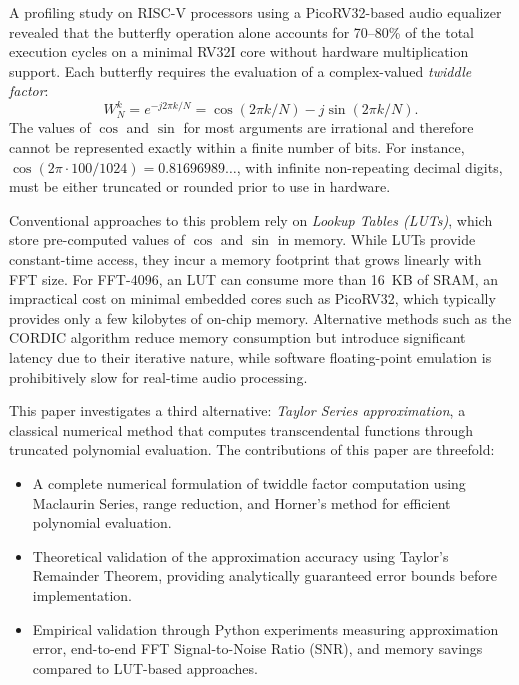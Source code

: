 \documentclass[conference]{IEEEtran}
\begin{document}
A profiling study on RISC-V processors using a PicoRV32-based audio
equalizer~\cite{qohar2026picorv32} revealed that the butterfly operation alone
accounts for 70--80\% of the total execution cycles on a minimal RV32I core
without hardware multiplication support. Each butterfly requires the evaluation
of a complex-valued
\textit{twiddle factor}:
\begin{equation}
W_N^k = e^{-j 2\pi k/N} = \cos(2\pi k/N) - j \sin(2\pi k/N).
\label{eq:twiddle}
\end{equation}
The values of $\cos$ and $\sin$ for most arguments are irrational and therefore
cannot be represented exactly within a finite number of bits. For instance,
$\cos(2\pi \cdot 100 / 1024) = 0.81696989\ldots$, with infinite non-repeating
decimal digits, must be either truncated or rounded prior to use in hardware.

Conventional approaches to this problem rely on \textit{Lookup Tables (LUTs)},
which store pre-computed values of $\cos$ and $\sin$ in memory. While LUTs
provide constant-time access, they incur a memory footprint that grows linearly
with FFT size. For FFT-4096, an LUT can consume more than 16~KB of SRAM, an
impractical cost on minimal embedded cores such as PicoRV32, which typically
provides only a few kilobytes of on-chip memory. Alternative methods such as the
CORDIC algorithm reduce memory consumption but introduce significant latency due
to their iterative nature, while software floating-point emulation is
prohibitively slow for real-time audio processing.

This paper investigates a third alternative: \textit{Taylor Series
approximation}, a classical numerical method that computes transcendental
functions through truncated polynomial evaluation. The contributions of this
paper are threefold:
\begin{itemize}
    \item A complete numerical formulation of twiddle factor computation using
    Maclaurin Series, range reduction, and Horner's method for efficient
    polynomial evaluation.
    \item Theoretical validation of the approximation accuracy using Taylor's
    Remainder Theorem, providing analytically guaranteed error bounds before
    implementation.
    \item Empirical validation through Python experiments measuring
    approximation error, end-to-end FFT Signal-to-Noise Ratio (SNR), and memory
    savings compared to LUT-based approaches.
\end{itemize}
\end{document}

